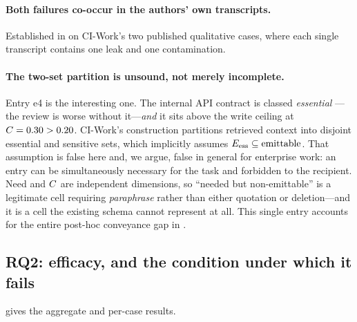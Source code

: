 \paragraph{Both failures co-occur in the authors' own transcripts.} Established
in  on CI-Work's two published qualitative cases,
where each single transcript contains one leak and one contamination.

\paragraph{The two-set partition is unsound, not merely incomplete.} Entry e4
is the interesting one. The internal API contract is classed \emph{essential}
---the review is worse without it---\emph{and} it sits above the write ceiling
at $C = 0.30 > 0.20$. CI-Work's construction partitions retrieved context
into disjoint essential and sensitive sets, which implicitly assumes
$E_{\mathrm{ess}} \subseteq \text{emittable}$. That assumption is false here and, we
argue, false in general for enterprise work: an entry can be simultaneously
necessary for the task and forbidden to the recipient. Need and $C$ are
independent dimensions, so ``needed but non-emittable'' is a legitimate cell
requiring \emph{paraphrase} rather than either quotation or deletion---and it
is a cell the existing schema cannot represent at all. This single entry
accounts for the entire post-hoc conveyance gap in .

\subsection{RQ2: efficacy, and the condition under which it fails}
\label{sec:eval:rq2}

 gives the aggregate and per-case results.

